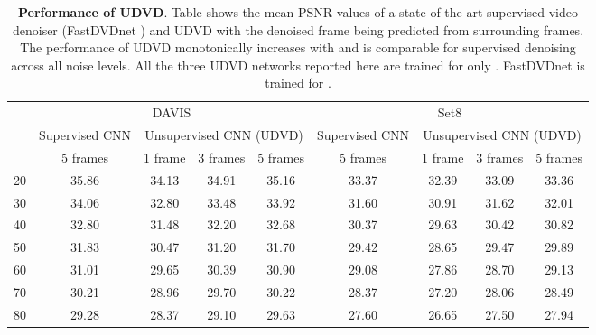 \documentclass[final]{cvpr}
\begin{document}
\begin{table*}
    \centering
    \begin{tabular}{c|cccc|cccc}
        \toprule
        
        \multicolumn{1}{l}{\phantom} &
        \multicolumn{4}{c}{DAVIS} &
        \multicolumn{4}{c}{Set8} \\
        
        \cmidrule(lr){2-5}
        \cmidrule(lr){6-9}
        \multicolumn{1}{l}{\phantom} &
        \multicolumn{1}{c}{Supervised CNN} &
        \multicolumn{3}{c}{Unsupervised CNN (UDVD)} &
        \multicolumn{1}{c}{Supervised CNN} &
        \multicolumn{3}{c}{Unsupervised CNN (UDVD)} \\
        
        \cmidrule(lr){2-2}
        \cmidrule(lr){3-5}
        \cmidrule(lr){6-6}
        \cmidrule(lr){7-9}
        \multicolumn{1}{c}{} &
        \multicolumn{1}{c}{5 frames} &
        \multicolumn{1}{c}{1 frame} &
        \multicolumn{1}{c}{3 frames} &
        \multicolumn{1}{c}{5 frames} &
        \multicolumn{1}{c}{5 frames} &
        \multicolumn{1}{c}{1 frame} & 
        \multicolumn{1}{c}{3 frames} & 
        \multicolumn{1}{c}{5 frames} \\
        
        \midrule
        
        20 & 35.86 & 34.13 & 34.91 & 35.16 & 33.37 & 32.39 & 33.09 & 33.36 \\
        30 & 34.06 & 32.80 & 33.48 & 33.92 & 31.60 & 30.91 & 31.62 & 32.01 \\
        40 & 32.80 & 31.48 & 32.20 & 32.68 & 30.37 & 29.63 & 30.42 & 30.82 \\
        50 & 31.83 & 30.47 & 31.20 & 31.70 & 29.42 & 28.65 & 29.47 & 29.89 \\
        60 & 31.01 & 29.65 & 30.39 & 30.90 & 29.08 & 27.86 & 28.70 & 29.13 \\
        70 & 30.21 & 28.96 & 29.70 & 30.22 & 28.37 & 27.20 & 28.06 & 28.49 \\
        80 & 29.28 & 28.37 & 29.10 & 29.63 & 27.60 & 26.65 & 27.50 & 27.94 \\
        
        \bottomrule
    \end{tabular}
        \caption{\textbf{Performance of UDVD}. Table shows the mean PSNR values of a state-of-the-art supervised video denoiser (FastDVDnet \cite{fastdvdnet} ) and UDVD with the denoised frame being predicted from  surrounding frames. The performance of UDVD monotonically increases with  and is comparable for supervised denoising across all noise levels. All the three UDVD networks reported here are trained for only . FastDVDnet is trained for . }
    \label{tab:frame_ablation}
\end{table*}
\end{document}
